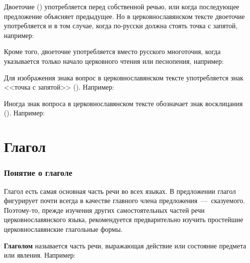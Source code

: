 \documentclass[11pt,a4paper,oneside]{memoir}
\begin{document}
    Двоеточие ({\slv{:}}) употребляется перед собственной речью, или когда последующее предложение объясняет предыдущее. Но в церковнославянском тексте двоеточие употребляется и в том случае, когда по-русски должна стоять точка с запятой, например:
    
    \bigskip{}

    Кроме того, двоеточие употребляется вместо русского многоточия,  когда указывается только начало церковного чтения или песнопения, например:
    
    \medskip
    {}
    \medskip
    
    Для изображения знака вопрос в церковнославянском тексте употребляется знак <<точка с запятой>> ({\slv{;}}). Например:

    \bigskip{}

    Иногда знак вопроса в церковнославянском тексте обозначает знак восклицания ({\slv{!}}). Например:

    \bigskip{}

        \section{Глагол}
                \subsubsection{Понятие о глаголе}

    Глагол есть самая основная часть речи во всех языках. В предложении глагол фигурирует почти всегда в качестве главного члена предложения~---~сказуемого. Поэтому-то, прежде изучения других самостоятельных частей речи церковнославянского языка, рекомендуется предварительно изучить простейшие церковнославянские глагольные формы.
    
    \textbf{Глаголом} называется часть речи, выражающая действие или состояние предмета или явления. Например:
\end{document}
